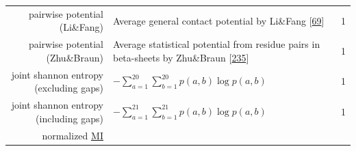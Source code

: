 \documentclass[11pt,a4paper,twoside]{book}
\theoremstyle{definition}
\theoremstyle{definition}
\theoremstyle{remark}
\begin{document}
\begin{longtable}[]{@{}rlc@{}}
\begin{minipage}[t]{0.23\columnwidth}\raggedleft\strut
pairwise potential (Li\&Fang)\strut
\end{minipage} & \begin{minipage}[t]{0.50\columnwidth}\raggedright\strut
Average general contact potential by Li\&Fang
{[}\protect\hyperlink{ref-Li2011}{69}{]}\strut
\end{minipage} & \begin{minipage}[t]{0.18\columnwidth}\centering\strut
1\strut
\end{minipage}\tabularnewline
\begin{minipage}[t]{0.23\columnwidth}\raggedleft\strut
pairwise potential (Zhu\&Braun)\strut
\end{minipage} & \begin{minipage}[t]{0.50\columnwidth}\raggedright\strut
Average statistical potential from residue pairs in beta-sheets by
Zhu\&Braun {[}\protect\hyperlink{ref-Zhu1999}{235}{]}\strut
\end{minipage} & \begin{minipage}[t]{0.18\columnwidth}\centering\strut
1\strut
\end{minipage}\tabularnewline
\begin{minipage}[t]{0.23\columnwidth}\raggedleft\strut
joint shannon entropy (excluding gaps)\strut
\end{minipage} & \begin{minipage}[t]{0.50\columnwidth}\raggedright\strut
\(- \sum_{a=1}^{20}\sum_{b=1}^{20} p(a,b) \log p(a,b)\)\strut
\end{minipage} & \begin{minipage}[t]{0.18\columnwidth}\centering\strut
1\strut
\end{minipage}\tabularnewline
\begin{minipage}[t]{0.23\columnwidth}\raggedleft\strut
joint shannon entropy (including gaps)\strut
\end{minipage} & \begin{minipage}[t]{0.50\columnwidth}\raggedright\strut
\(- \sum_{a=1}^{21}\sum_{b=1}^{21} p(a,b) \log p(a,b)\)\strut
\end{minipage} & \begin{minipage}[t]{0.18\columnwidth}\centering\strut
1\strut
\end{minipage}\tabularnewline
\begin{minipage}[t]{0.23\columnwidth}\raggedleft\strut
normalized \protect\hyperlink{abbrev}{MI}\strut
\end{minipage} & \begin{minipage}[t]{0.50\columnwidth}\raggedright\strut

\end{minipage}
\end{longtable}
\end{document}
